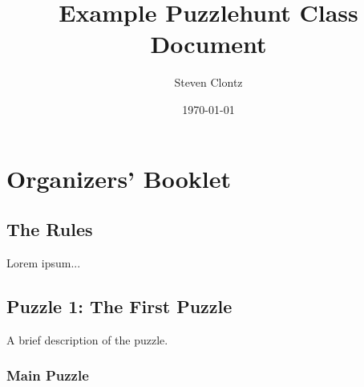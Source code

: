 \documentclass{puzzlehunt}
\title{Example Puzzlehunt Class Document}
\author{Steven Clontz}
\date{\today}
\begin{document}
\frontmatter %

\puzzlehuntTitle %
\tableofcontents %


\mainmatter %

\part{Organizers' Booklet}

\chapter{The Rules}
Lorem ipsum...

\chapter{Puzzle 1: The First Puzzle}
A brief description of the puzzle.

\section{Main Puzzle}
\end{document}

